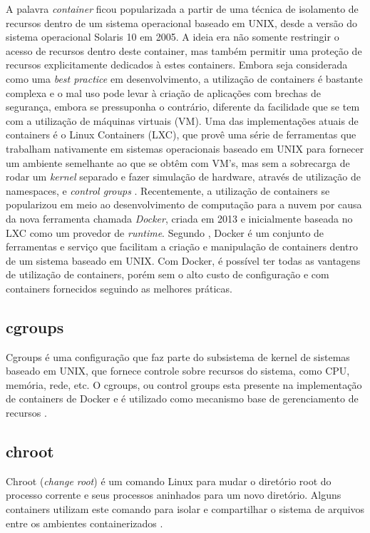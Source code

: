 \documentclass[twoside,english,brazilian]{UNISINOSartigo}
\begin{document}
A palavra \textit{container} ficou popularizada a partir de uma técnica de isolamento de recursos dentro de um sistema operacional baseado em UNIX, desde a versão do sistema operacional Solaris 10 em 2005. A ideia era não somente restringir o acesso de recursos dentro deste container, mas também permitir uma proteção de recursos explicitamente dedicados à estes containers. Embora seja considerada como uma \textit{best practice} em desenvolvimento, a utilização de containers é bastante complexa e o mal uso pode levar à criação de aplicações com brechas de segurança, embora se pressuponha o contrário, diferente da facilidade que se tem com a utilização de máquinas virtuais (VM). Uma das implementações atuais de containers é o Linux Containers (LXC), que provê uma série de ferramentas que trabalham nativamente em sistemas operacionais baseado em UNIX para fornecer um ambiente semelhante ao que se obtêm com VM's, mas sem a sobrecarga de rodar um \textit{kernel} separado e fazer simulação de hardware, através de utilização de namespaces, e \textit{control groups} \cite{LXC2016}.
Recentemente, a utilização de containers se popularizou em meio ao desenvolvimento de computação para a nuvem por causa da nova ferramenta chamada \textit{Docker}, criada em 2013 e inicialmente baseada no LXC como um provedor de \textit{runtime}. Segundo \cite{NICKOLOFF2016}, Docker é um conjunto de ferramentas e serviço que facilitam a criação e manipulação de containers dentro de um sistema baseado em UNIX. Com Docker, é possível ter todas as vantagens de utilização de containers, porém sem o alto custo de configuração e com containers fornecidos seguindo as melhores práticas. 

\subsection{cgroups}
Cgroups é uma configuração que faz parte do subsistema de kernel de sistemas baseado em UNIX, que fornece controle sobre recursos do sistema, como CPU, memória, rede, etc. O cgroups, ou control groups esta presente na implementação de containers de Docker e é utilizado como mecanismo base de gerenciamento de recursos \cite{NICKOLOFF2016}.

\subsection{chroot}
Chroot (\textit{change root}) é um comando Linux para mudar o diretório root do processo corrente e seus processos aninhados para um novo diretório. Alguns containers utilizam este comando para isolar e compartilhar o sistema de arquivos entre os ambientes containerizados \cite{Dua2014}. 
\end{document}
